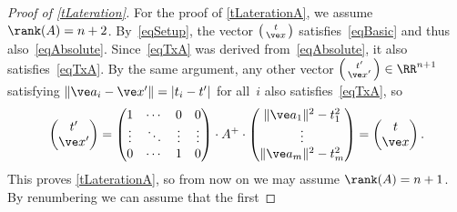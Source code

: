 \documentclass[reqno]{amsart}
\begin{document}
\begin{proof}[Proof of \cref{tLateration}]
  For the proof of \cref{tLaterationA}, we assume $\rank(A) =
  n+2$. By~\eqref{eqSetup}, the vector
  $\left(\begin{smallmatrix} t \\ \ve x\end{smallmatrix}\right)$
  satisfies~\eqref{eqBasic} and thus
  also~\eqref{eqAbsolute}. Since~\eqref{eqTxA} was derived
  from~\eqref{eqAbsolute}, it also satisfies~\eqref{eqTxA}. By the
  same argument, any other vector
  $\left(\begin{smallmatrix} t' \\ \ve x'\end{smallmatrix}\right) \in
  \RR^{n+1}$ satisfying $\lVert\ve a_i - \ve x'\rVert = |t_i - t'|$
  for all~$i$ also satisfies~\eqref{eqTxA}, so
  \[
    \begin{pmatrix}
      t' \\ \ve x'
    \end{pmatrix} =
    \begin{pmatrix}
      1 & \cdots & 0 & 0 \\
      \vdots & \ddots & \vdots & \vdots \\
      0 & \cdots & 1 & 0
    \end{pmatrix} \cdot A^+ \cdot \begin{pmatrix}
      \lVert\ve a_1\rVert^2 - t_1^2 \\
      \vdots \\
      \lVert\ve a_m\rVert^2 - t_m^2
    \end{pmatrix} = \begin{pmatrix}
      t \\ \ve x
    \end{pmatrix}.
  \]
  This proves \cref{tLaterationA}, so from now on we may assume
  $\rank(A) = n+1$. By renumbering we can assume that the first

\end{proof}
\end{document}
